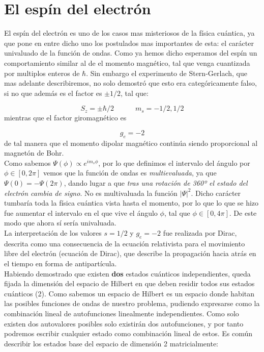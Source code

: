 \documentclass[12pt,a4paper]{article}
\numberwithin{equation}{section}
\numberwithin{figure}{section}
\newcommand{\tquad}{\quad \quad \quad}
\begin{document}
\section{El espín del electrón}

El espín del electrón es uno de los casos mas misteriosos de la física cuántica, ya que pone en entre dicho uno los postulados mas importantes de esta: el carácter univaluado de la función de ondas. Como ya hemos dicho esperamos del espín un comportamiento similar al de el momento magnético, tal que venga cuantizada por multiplos enteros de $\hbar$. Sin embargo el experimento de Stern-Gerlach, que mas adelante describiremos, no solo demostró que esto era categóricamente falso, si no que además es el factor es $\pm 1/2$, tal que:

\begin{equation}
S_z = \pm \hbar / 2 \tquad m_s = -1/2, 1/2
\end{equation}
mientras que el factor giromagnético es

\begin{equation}
g_e = -2
\end{equation}
de tal manera que el momento dipolar magnético continúa siendo proporcional al magnetón de Bohr. \\

Como sabemos $ \Psi (\phi) \varpropto e^{i m_s \phi}$, por lo que definimos el intervalo del ángulo por $\phi \in [0,2\pi]$ vemos que la función de ondas es \textit{multievaluada}, ya que $\Psi(0) = - \Psi (2 \pi)$, dando lugar a que \textit{tras una rotación de 360º el estado del electrón cambia de signo}. No es multivaluada la función $|\Psi|^2$. Dicho carácter tumbaría toda la física cuántica vista hasta el momento, por lo que lo que se hizo fue aumentar el intervalo en el que vive el ángulo $\phi$, tal que  $\phi \in [0,4 \pi]$.  De este modo que ahora sí sería univaluada. \\ 

La interpretación de los valores $s=1/2$ y $g_e = -2$ fue realizada por Dirac, descrita como una consecuencia de la ecuación relativista para el movimiento libre del electrón (ecuación de Dirac), que describe la propagación hacia atrás en el tiempo en forma de antipartícula. \\

Habiendo demostrado que existen \textbf{dos} estados cuánticos independientes, queda fijada la dimensión del espacio de Hilbert en que deben residir todos sus estados cuánticos (2). Como sabemos un espacio de Hilbert es un espacio donde habitan las posibles funciones de ondas de nuestro problema, pudiendo expresarse como la combinación lineal de autofunciones linealmente independientes. Como solo existen dos autovalores posibles solo existirán dos autofunciones, y por tanto podremos escribir cualquier estado como combinación lineal de estos. Es común describir los estados base del espacio de dimensión 2 matricialmente:
\end{document}
